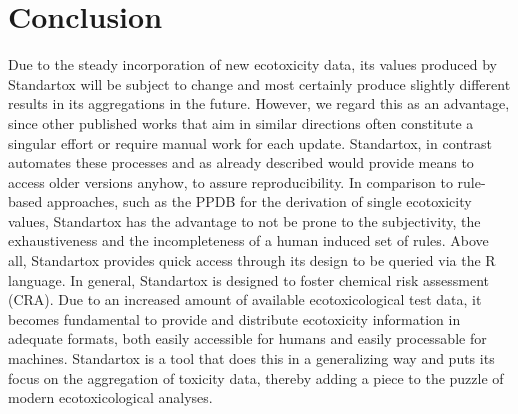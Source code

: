 \section{Conclusion}

Due to the steady incorporation of new ecotoxicity data, its values produced by Standartox will be subject to change and most certainly produce slightly different results in its aggregations in the future. However, we regard this as an advantage, since other published works that aim in similar directions often constitute a singular effort or require manual work for each update. Standartox, in contrast automates these processes and as already described would provide means to access older versions anyhow, to assure reproducibility. In comparison to rule-based approaches, such as the PPDB for the derivation of single ecotoxicity values, Standartox has the advantage to not be prone to the subjectivity, the exhaustiveness and the incompleteness of a human induced set of rules. Above all, Standartox provides quick access through its design to be queried via the R language. In general, Standartox is designed to foster chemical risk assessment (CRA). Due to an increased amount of available ecotoxicological test data, it becomes fundamental to provide and distribute ecotoxicity information in adequate formats, both easily accessible for humans and easily processable for machines. Standartox is a tool that does this in a generalizing way and puts its focus on the aggregation of toxicity data, thereby adding a piece to the puzzle of modern ecotoxicological analyses.